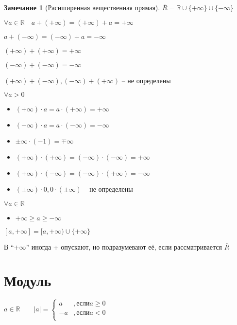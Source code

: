\documentclass{book}
\newcommand\R{\ensuremath{\mathbb{R}}}
\newcommand{\ov}[1]{\overline{#1}}
\theoremstyle{definition}
\newtheorem*{note}{Замечание}
\begin{document}
    \begin{note}
        [Расиширенная вещественная прямая]

        $\overline{R} = \R\cup \{+\infty \}\cup \{-\infty \}$

        $\forall a\in \R\quad a + (+\infty ) = (+\infty ) + a = +\infty $

        $a+(-\infty ) = (-\infty ) + a = -\infty $

        $(+\infty ) + (+\infty ) = +\infty $

        $(-\infty ) + (-\infty ) = -\infty $

        $(+\infty ) + (-\infty ), (-\infty ) + (+\infty )$ -- не определены

        $\forall a>0$
        \begin{itemize}
            \item $(+\infty )\cdot a = a\cdot (+\infty ) = +\infty $
            \item $(-\infty ) \cdot  a = a\cdot (-\infty ) = -\infty $
            \item $\pm \infty \cdot (-1) = \mp \infty $
            \item $(+\infty ) \cdot  (+\infty ) = (-\infty )\cdot (-\infty ) = +\infty $
            \item $(+\infty )\cdot (-\infty ) = (-\infty )\cdot (+\infty ) = -\infty $
            \item $(\pm \infty )\cdot 0, 0\cdot (\pm \infty )$ -- не определены
        \end{itemize}

        $\forall a\in \R$
        \begin{itemize}
            \item $+\infty \geqslant a\geqslant -\infty $
        \end{itemize}

        $[a,+\infty ] = [a,+\infty ) \cup \{+\infty \}$

        В ``$+\infty $'' иногда + опускают, но подразумевают её, если рассматривается $\ov R$
    \end{note}

    \section{Модуль}

    $a\in \R\qquad |a| = 
    \begin{cases}
        a&,\text{если} a\geqslant 0\\
        -a&, \text{если} a<0\\
    \end{cases}$
\end{document}
